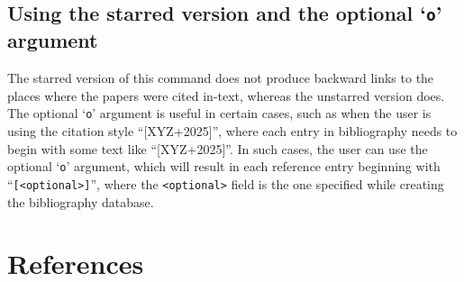 \documentclass[letter, 11pt]{article}
\begin{document}
  \subsection*{Using the starred version and the optional `\texttt{o}' argument}
  The starred version of this command does not produce backward links to the places where the papers were cited in-text, whereas the unstarred version does. The optional `\texttt{o}' argument is useful in certain cases, such as when the user is using the citation style ``[XYZ+2025]'', where each entry in bibliography needs to begin with some text like ``[XYZ+2025]''. In such cases, the user can use the optional `\texttt{o}' argument, which will result in each reference entry beginning with ``\texttt{[<optional>]}'', where the \texttt{<optional>} field is the one specified while creating the bibliography database.
  \section*{References}
  \dumbibCreateBibliography
\end{document}
